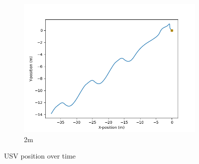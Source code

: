 \documentclass[class=article, crop=false]{standalone}
\begin{document}
\begin{figure}
\begin{subfigure}[b]{0.48\textwidth}
        \centering
        \includegraphics{scenario1/rov-0m/2.0m/usv_position_uncontrolled}
        \caption{2m}
        \label{}
    \end{subfigure}

    \caption{USV position over time}
\end{figure}
\end{document}
